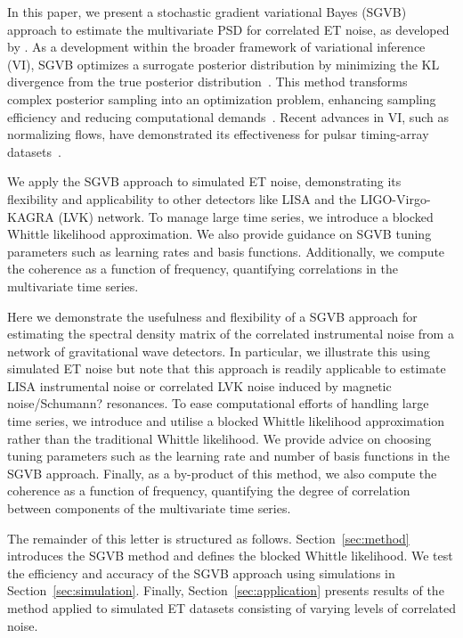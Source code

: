\documentclass[%
 reprint,
 amsmath,amssymb,
 aps,
 nofootinbib,
]{revtex4-2}
\begin{document}
In this paper, we present a stochastic gradient variational Bayes (SGVB)  approach to estimate the multivariate \ac{PSD} for correlated \ac{ET} noise, as developed by \citet{Hu2023}. As a development within the broader framework of variational inference (VI), SGVB optimizes a surrogate posterior distribution by minimizing the \ac{KL} divergence from the true posterior distribution~\cite{Jordan1999,Wainwright2008,Blei2017}.  
This method transforms complex posterior sampling into an optimization problem, enhancing sampling efficiency and reducing computational demands~\cite{Blei2006,kingma2022}.
Recent advances in VI, such as normalizing flows, have demonstrated its effectiveness for pulsar timing-array datasets~\cite{Vallisneri2024}. 

We apply the SGVB approach to simulated ET noise, demonstrating its flexibility and applicability to other detectors like LISA and the LIGO-Virgo-KAGRA (LVK) network.
To manage large time series, we introduce a blocked Whittle likelihood approximation. 
We also provide guidance on SGVB tuning parameters such as learning rates and basis functions. Additionally, we compute the coherence as a function of frequency, quantifying correlations in the multivariate time series.

Here we demonstrate the usefulness and flexibility of a SGVB approach for estimating the spectral density matrix of the correlated instrumental noise from a  network of gravitational wave detectors.
In particular, we illustrate this using simulated ET noise but note that this approach is readily applicable to estimate  \ac{LISA} instrumental noise or correlated \ac{LVK} noise induced by magnetic noise/Schumann? resonances.
To ease computational efforts of handling large time series, we introduce and utilise a blocked Whittle likelihood approximation rather than the traditional Whittle likelihood. 
We provide advice on choosing tuning parameters such as the learning rate and number of basis functions in the SGVB approach. 
Finally, as a by-product of this method, we also compute the coherence as a function of frequency, quantifying the degree of correlation between components of the multivariate time series. 

The remainder of this letter is structured as follows. 
Section~\ref{sec:method} introduces the \ac{SGVB} method and defines the blocked Whittle likelihood.
We test the efficiency and accuracy of the SGVB approach using simulations in Section~\ref{sec:simulation}.
Finally, Section~\ref{sec:application} presents results of the method applied to simulated \ac{ET} datasets consisting of varying levels of correlated noise. 
\end{document}
